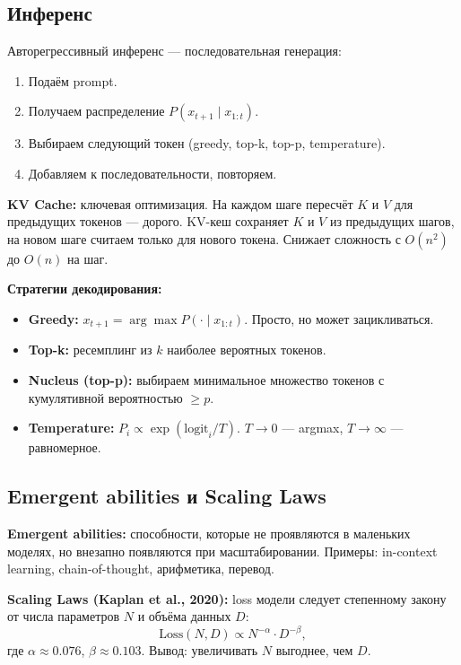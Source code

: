 \documentclass[a4paper,12pt]{article}
\begin{document}
\subsection{Инференс}

Авторегрессивный инференс --- последовательная генерация:
\begin{enumerate}
    \item Подаём prompt.
    \item Получаем распределение $P(x_{t+1} \mid x_{1:t})$.
    \item Выбираем следующий токен (greedy, top-k, top-p, temperature).
    \item Добавляем к последовательности, повторяем.
\end{enumerate}

\textbf{KV Cache:} ключевая оптимизация. На каждом шаге пересчёт $K$ и $V$ для предыдущих токенов --- дорого. KV-кеш сохраняет $K$ и $V$ из предыдущих шагов, на новом шаге считаем только для нового токена. Снижает сложность с $O(n^2)$ до $O(n)$ на шаг.

\textbf{Стратегии декодирования:}
\begin{itemize}
    \item \textbf{Greedy:} $x_{t+1} = \arg\max P(\cdot \mid x_{1:t})$. Просто, но может зацикливаться.
    \item \textbf{Top-k:} ресемплинг из $k$ наиболее вероятных токенов.
    \item \textbf{Nucleus (top-p):} выбираем минимальное множество токенов с кумулятивной вероятностью $\ge p$.
    \item \textbf{Temperature:} $P_i \propto \exp(\text{logit}_i / T)$. $T \to 0$ --- argmax, $T \to \infty$ --- равномерное.
\end{itemize}

\subsection{Emergent abilities и Scaling Laws}

\textbf{Emergent abilities:} способности, которые не проявляются в маленьких моделях, но внезапно появляются при масштабировании. Примеры: in-context learning, chain-of-thought, арифметика, перевод.

\textbf{Scaling Laws (Kaplan et al., 2020):} loss модели следует степенному закону от числа параметров $N$ и объёма данных $D$:
\[
\text{Loss}(N, D) \propto N^{-\alpha} \cdot D^{-\beta},
\]
где $\alpha \approx 0.076$, $\beta \approx 0.103$. Вывод: увеличивать $N$ выгоднее, чем $D$.
\end{document}
